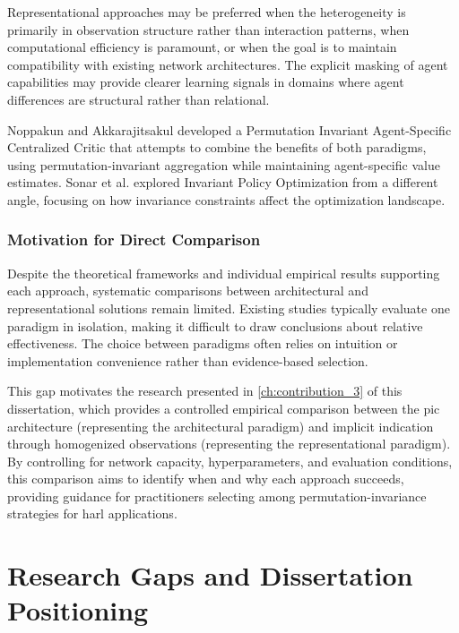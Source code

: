 Representational approaches may be preferred when the
heterogeneity is primarily in observation structure rather
than interaction patterns, when computational efficiency is
paramount, or when the goal is to maintain compatibility with
existing network architectures. The explicit masking of agent
capabilities may provide clearer learning signals in domains
where agent differences are structural rather than relational.

Noppakun and Akkarajitsakul \cite{noppakun2022} developed a
Permutation Invariant Agent-Specific Centralized Critic that
attempts to combine the benefits of both paradigms, using
permutation-invariant aggregation while maintaining agent-specific
value estimates. Sonar et al. \cite{sonar2021} explored
Invariant Policy Optimization from a different angle, focusing
on how invariance constraints affect the optimization landscape.

\subsubsection{Motivation for Direct Comparison}

Despite the theoretical frameworks and individual empirical
results supporting each approach, systematic comparisons
between architectural and representational solutions remain
limited. Existing studies typically evaluate one paradigm
in isolation, making it difficult to draw conclusions about
relative effectiveness. The choice between paradigms often
relies on intuition or implementation convenience rather than
evidence-based selection.

This gap motivates the research presented in \cref{ch:contribution_3} 
of this dissertation, which provides a controlled empirical
comparison between the \gls{pic} architecture (representing
the architectural paradigm) and implicit indication through
homogenized observations (representing the representational
paradigm). By controlling for network capacity, hyperparameters,
and evaluation conditions, this comparison aims to identify
when and why each approach succeeds, providing guidance for
practitioners selecting among permutation-invariance strategies
for \gls{harl} applications.

\section{Research Gaps and Dissertation Positioning}
\label{sec:research-gaps}

